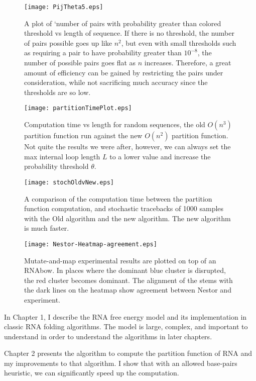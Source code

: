 \begin{figure}[t]
\centering
\texttt{[image: PijTheta5.eps]} 
\caption[Number of probable pairs above threshold $\theta$]{A plot of
  `number of pairs with probability greater than colored threshold
  vs length of sequence. If there is no threshold, the number of pairs
  possible goes up like $n^2$, but even with small thresholds such as
  requiring a pair to have probability greater than $10^{-8}$, the
  number of possible pairs goes flat as $n$ increases. Therefore, a
  great amount of efficiency can be gained by restricting the pairs
  under consideration, while not sacrificing much accuracy since the
  thresholds are so low. }
\label{fig:probThresh1}
\end{figure}
\begin{figure}[t]
\centering
\texttt{[image: partitionTimePlot.eps]} 
\caption[Partition Function Speedups]{Computation time vs length for
  random sequences, the old $O(n^3)$ partition function run against
  the new $O(n^2)$ partition function. Not quite the results we were
  after, however, we can always set the max internal loop length $L$
  to a lower value and increase the probability threshold $\theta$.}
\label{fig:pfResults1}
\end{figure}
\begin{figure}[t]
\centering
\texttt{[image: stochOldvNew.eps]}
\caption[Stochastic Traceback Speedups]{A comparison of the
  computation time between the partition function computation, and
  stochastic tracebacks of 1000 samples with the Old algorithm and the
  new algorithm. The new algorithm is much faster.}
\label{fig:stochOvN1}
\end{figure}
\begin{figure}[t]
\centering
\texttt{[image: Nestor-Heatmap-agreement.eps]}
\caption[Nestor-Reactivity Agreement]{ Mutate-and-map experimental
  results are plotted on top of an RNAbow. In places where the
  dominant blue cluster is disrupted, the red cluster becomes
  dominant. The alignment of the stems with the dark lines on the
  heatmap show agreement between Nestor and experiment.}
\label{fig:Nestor-Heatmap-agreement}
\end{figure}
In Chapter 1, I describe the RNA free energy model and its
implementation in classic RNA folding algorithms. The model is large,
complex, and important to understand in order to understand the
algorithms in later chapters.

Chapter 2 presents the algorithm to compute the partition function of
RNA and my improvements to that algorithm. I show that with an allowed
base-pairs heuristic, we can significantly speed up the computation.

